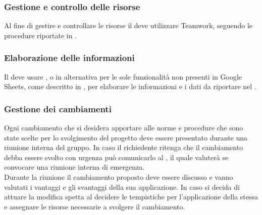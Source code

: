 \subsubsection{Gestione e controllo delle risorse}
Al fine di gestire e controllare le risorse il \Responsabile{} deve utilizzare Teamwork, seguendo le procedure riportate in .

\subsubsection{Elaborazione delle informazioni}
Il \Responsabile{} deve usare , o in alternativa  per le sole funzionalità non presenti in Google Sheets, come descritto in , per elaborare le informazioni e i dati da riportare nel \PianoDiProgetto.

\subsubsection{Gestione dei cambiamenti}

Ogni cambiamento che si desidera apportare alle norme e procedure che sono state scelte per lo svolgimento del progetto deve essere presentato durante una riunione interna del gruppo. In caso il richiedente ritenga che il cambiamento debba essere svolto con urgenza può comunicarlo al \Responsabile{}, il quale valuterà se convocare una riunione interna di emergenza.
\\Durante la riunione il cambiamento proposto deve essere discusso e vanno valutati i vantaggi e gli svantaggi della sua applicazione. In caso si decida di attuare la modifica spetta al \Responsabile{} decidere le tempistiche per l'applicazione della stessa e assegnare le risorse necessarie a svolgere il cambiamento.

